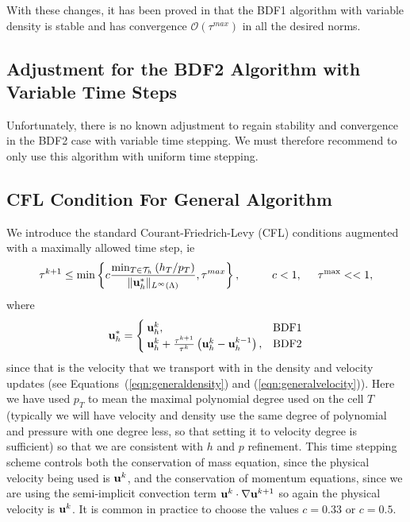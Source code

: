 \documentclass[letterpaper]{erdc}
\begin{document}
With these changes, it has been proved in \cite{bonito2015modified} that the BDF1 algorithm with variable density is stable and has convergence $\mathcal{O}(\tau^{max})$ in all the desired norms.


%
%
\subsection{Adjustment for the BDF2 Algorithm with Variable Time Steps}
Unfortunately, there is no known adjustment to regain stability and convergence in the BDF2 case with variable time stepping.  We must therefore recommend to only use this algorithm with uniform time stepping.




%
%
\subsection{CFL Condition For General Algorithm}\label{sec:CFLgeneralalgorithm}
We introduce the standard Courant-Friedrich-Levy (CFL) conditions augmented with a maximally allowed time step, ie
\begin{equation}
  \tau^{k+1} \leq \min \left\{c \frac{\min_{T\in\mathcal{T}_h}\left(h_{T}/p_T\right)}{\|\textbf{u}_h^{*}\|_{L^{\infty}(\Lambda)}}, \tau^{max}\right\}, \hspace{1cm} c<1, \hspace{0.5cm}\tau^{\max} << 1,
\end{equation}
where 
\begin{equation}
  \ub_h^{*} = \begin{cases} \ub_h^{k}, & \mbox{BDF1}\\ \ub_h^{k}+ \frac{\tau^{k+1}}{\tau^{k}}\left(\ub_h^{k} - \ub_h^{k-1}\right),& $\mbox{BDF2}$ \end{cases}
\end{equation}
since that is the velocity that we transport with in the density and velocity updates (see Equations~(\ref{eqn:generaldensity}) and (\ref{eqn:generalvelocity})).
Here we have used $p_T$ to mean the maximal polynomial degree used on the cell $T$ (typically we will have velocity and density use the same degree of polynomial and pressure with one degree less, so that setting it to velocity degree is sufficient) so that we are consistent with $h$ and $p$ refinement.  This time stepping scheme controls both the conservation of mass equation, since the physical velocity being used is $\textbf{u}^{k}$, and the conservation of momentum equations, since we are using the semi-implicit convection term $\textbf{u}^{k}\cdot\nabla\textbf{u}^{k+1}$ so again the physical velocity is $\textbf{u}^{k}$.  It is common in practice to choose the values $c=0.33$ or $c=0.5$.
\end{document}
